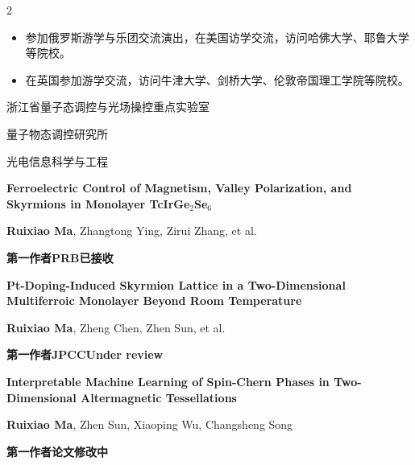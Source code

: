 \documentclass[10pt,a4paper,withhyper,ragged2e]{altacv}
\begin{document}
\begin{paracol}{2}



\begin{itemize}
  \item 参加俄罗斯游学与乐团交流演出，在美国访学交流，访问哈佛大学、耶鲁大学等院校。
  \item 在英国参加游学交流，访问牛津大学、剑桥大学、伦敦帝国理工学院等院校。
\end{itemize}

\switchcolumn


\small 浙江省量子态调控与光场操控重点实验室\par
量子物态调控研究所

\divider

\small 光电信息科学与工程


{\footnotesize
\textbf{Ferroelectric Control of Magnetism, Valley Polarization, and Skyrmions in Monolayer TcIrGe$_2$Se$_6$}\par
\textbf{Ruixiao Ma}, Zhangtong Ying, Zirui Zhang, et al.\par
\textcolor{accent}{\textbf{第一作者\enskip\textperiodcentered\enskip PRB\enskip\textperiodcentered\enskip 已接收}}\par
}

\divider

{\footnotesize
\textbf{Pt-Doping-Induced Skyrmion Lattice in a Two-Dimensional Multiferroic Monolayer Beyond Room Temperature}\par
\textbf{Ruixiao Ma}, Zheng Chen, Zhen Sun, et al.\par
\textcolor{accent}{\textbf{第一作者\enskip\textperiodcentered\enskip JPCC\enskip\textperiodcentered\enskip Under review}}\par
}

\divider

{\footnotesize
\textbf{Interpretable Machine Learning of Spin-Chern Phases in Two-Dimensional Altermagnetic Tessellations}\par
\textbf{Ruixiao Ma}, Zhen Sun, Xiaoping Wu, Changsheng Song\par
\textcolor{accent}{\textbf{第一作者\enskip\textperiodcentered\enskip 论文修改中}}\par
}


\end{paracol}
\end{document}

